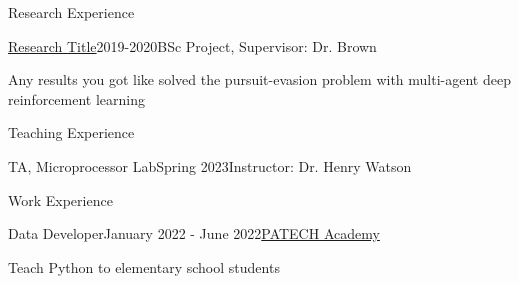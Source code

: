 \documentclass{resume} %
\begin{document}
    \begin{rSection}{Research Experience}
        \begin{rSubsection}{\href{https://link_to_your_research.com}{\textcolor{coolblack}{Research Title}}}{2019-2020}{BSc Project, Supervisor: Dr. Brown}{ }
            \item Any results you got like solved the pursuit-evasion problem with multi-agent deep reinforcement learning
        \end{rSubsection}
    \end{rSection}

	\begin{rSection}{Teaching Experience}
		\begin{rSubsection}{TA, Microprocessor Lab}{Spring 2023}{Instructor: Dr. Henry Watson}{}
		\end{rSubsection}
	\end{rSection}

    \begin{rSection}{Work Experience}
        \begin{rSubsection}{Data Developer}{January 2022 - June 2022}{\href{https://patech.ir}{\textcolor{coolblack}{PATECH Academy}}}{ }
            \item Teach Python to elementary school students
        \end{rSubsection}
    \end{rSection}
\end{document}
